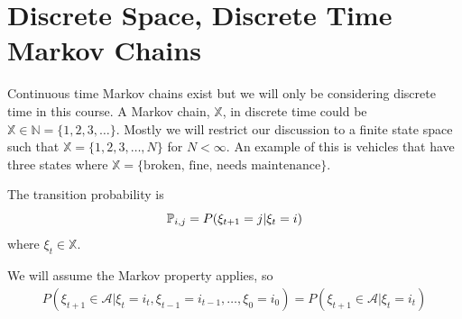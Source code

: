 \mainmatter%
\setcounter{page}{1}

\lectureseries[\course]{\course}

\date{October 27, 2009}

\setaddress%

\setcounter{lecture}{8}
\setcounter{chapter}{8}


\section{Discrete Space, Discrete Time Markov Chains}
Continuous time Markov chains exist but we will only be considering discrete time in this course.
A Markov chain, $\mathbb{X}$, in discrete time could be $\mathbb{X}\in\mathbb{N}=\{1,2,3,\ldots\}$.
Mostly we will restrict our discussion to a finite state space such that $\mathbb{X}=\{1,2,3,\ldots,N\}$ for $N<\infty$.
An example of this is vehicles that have three states where $\mathbb{X}=\{\text{broken,~fine,~needs~maintenance}\}$.

\begin{definition}
The transition probability is
$$\mathbb{P}_{i,j} = P(\xi_{t+1}=j|\xi_t=i)$$
where $\xi_t\in\mathbb{X}$.
\end{definition}

We will assume the Markov property applies, so
\begin{align*}
P(\xi_{t+1}\in\mathcal{A} | \xi_t=i_t, \xi_{t-1}=i_{t-1},\ldots,\xi_0=i_0) = P(\xi_{t+1}\in\mathcal{A}|\xi_t=i_t)
\end{align*}


